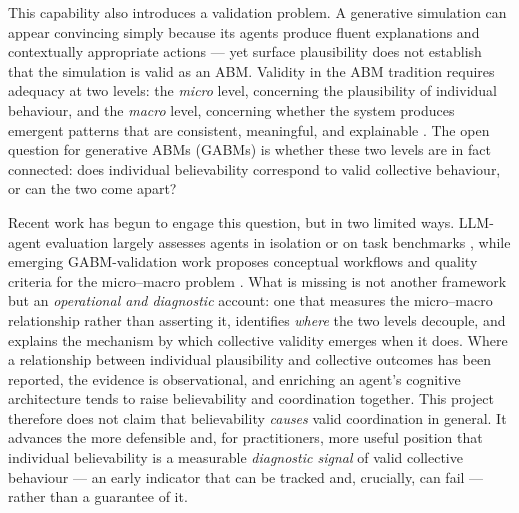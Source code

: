 \documentclass[11pt]{article}
\begin{document}
This capability also introduces a validation problem. A generative simulation can appear convincing simply because its agents produce fluent explanations and contextually appropriate actions --- yet surface plausibility does not establish that the simulation is valid as an ABM. Validity in the ABM tradition requires adequacy at two levels: the \emph{micro} level, concerning the plausibility of individual behaviour, and the \emph{macro} level, concerning whether the system produces emergent patterns that are consistent, meaningful, and explainable \cite{windrum2007empirical, moss2005towards}. The open question for generative ABMs (GABMs) is whether these two levels are in fact connected: does individual believability correspond to valid collective behaviour, or can the two come apart?

Recent work has begun to engage this question, but in two limited ways. LLM-agent evaluation largely assesses agents in isolation or on task benchmarks \cite{li2024agentbench, mohammadi2025evaluation}, while emerging GABM-validation work proposes conceptual workflows and quality criteria for the micro--macro problem \cite{adornetto2025overview, sen2025validating, larooij2025critical}. What is missing is not another framework but an \emph{operational and diagnostic} account: one that measures the micro--macro relationship rather than asserting it, identifies \emph{where} the two levels decouple, and explains the mechanism by which collective validity emerges when it does. Where a relationship between individual plausibility and collective outcomes has been reported, the evidence is observational, and enriching an agent's cognitive architecture tends to raise believability and coordination together. This project therefore does not claim that believability \emph{causes} valid coordination in general. It advances the more defensible and, for practitioners, more useful position that individual believability is a measurable \emph{diagnostic signal} of valid collective behaviour --- an early indicator that can be tracked and, crucially, can fail --- rather than a guarantee of it.
\end{document}
